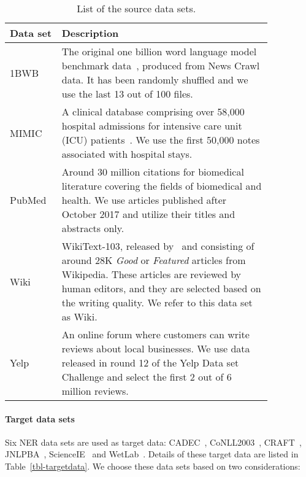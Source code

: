 \documentclass[11pt,a4paper]{article}
\begin{document}
\begin{table}[tb]
\begin{footnotesize}
\begin{center}
\begin{tabular}{p{0.15\linewidth}p{0.7\linewidth}}
\toprule
\bf Data set & \bf Description \\ \midrule
1BWB & The original one billion word language model benchmark data~\citep{Chelba:Mikolov:arXiv:2013}, produced from News Crawl data. It has been randomly shuffled and we use the last 13 out of 100 files. \\ \midrule
MIMIC & A clinical database comprising over 58,000 hospital admissions for intensive care unit (ICU) patients~\citep{Johnson:Pollard:SD:2016}. We use the first 50,000 notes associated with hospital stays. \\ \midrule 
PubMed & Around 30 million citations for biomedical literature covering the fields of biomedical and health. We use articles published after October 2017 and utilize their titles and abstracts only. \\ \midrule 
Wiki & WikiText-103, released by~\citet{Merity:Xiong:arXiv:2016} and consisting of around 28K \emph{Good} or \emph{Featured} articles from Wikipedia. These articles are reviewed by human editors, and they are selected based on the writing quality. We refer to this data set as Wiki. \\ \midrule Yelp & An online forum where customers can write reviews about local businesses. We use data released in round 12 of the Yelp Data set Challenge and select the first 2 out of 6 million reviews. \\ \bottomrule
\end{tabular}
\caption{\label{tbl-sourcedata}List of the source data sets.}
\end{center}
\end{footnotesize}
\end{table}

\paragraph{Target data sets}
Six NER data sets are used as target data: CADEC~\cite{Karimi:Metke:JBI:2015}, CoNLL2003~\cite{Sang:Meulder:CONLL:2003}, CRAFT~\cite{Bada:Eckert:BMC:2012}, JNLPBA~\cite{Collier:Kim:BioNLP:2004}, ScienceIE~\cite{Augenstein:Das:SemEval:2017} and WetLab~\cite{Kulkarni:Xu:NAACL:2018}. 
Details of these target data are listed in Table~\ref{tbl-targetdata}. 
We choose these data sets based on two considerations: 
\end{document}
